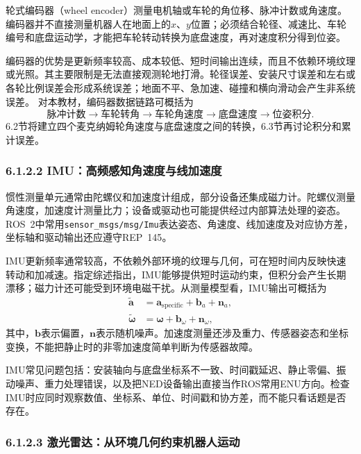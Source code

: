 \documentclass[UTF8,zihao=-4]{ctexart}
\newcommand{\vect}[1]{\bm{#1}}
\begin{document}
轮式编码器（wheel encoder）测量电机轴或车轮的角位移、脉冲计数或角速度。编码器并不直接测量机器人在地面上的$x$、$y$位置；必须结合轮径、减速比、车轮编号和底盘运动学，才能把车轮转动转换为底盘速度，再对速度积分得到位姿。

编码器的优势是更新频率较高、成本较低、短时间输出连续，而且不依赖环境纹理或光照。其主要限制是无法直接观测轮地打滑。轮径误差、安装尺寸误差和左右或各轮比例误差会形成系统误差；地面不平、急加速、碰撞和横向滑动会产生非系统误差。
对本教材，编码器数据链路可概括为
\begin{equation}
  \text{脉冲计数}
  \rightarrow \text{车轮转角}
  \rightarrow \text{车轮角速度}
  \rightarrow \text{底盘速度}
  \rightarrow \text{位姿积分}.
  \label{eq:encoder-chain}
\end{equation}
6.2节将建立四个麦克纳姆轮角速度与底盘速度之间的转换，6.3节再讨论积分和累计误差。

\subsubsection*{6.1.2.2 IMU：高频感知角速度与线加速度}

惯性测量单元通常由陀螺仪和加速度计组成，部分设备还集成磁力计。陀螺仪测量角速度，加速度计测量比力；设备或驱动也可能提供经过内部算法处理的姿态。ROS~2中常用\texttt{sensor\_msgs/msg/Imu}表达姿态、角速度、线加速度及对应协方差\cite{ros2imu}，坐标轴和驱动输出还应遵守REP~145\cite{rep145}。

IMU更新频率通常较高，不依赖外部环境的纹理与几何，可在短时间内反映快速转动和加减速。指定综述指出，IMU能够提供短时运动约束，但积分会产生长期漂移；磁力计还可能受到环境电磁干扰\cite{fan2025fusion}。从测量模型看，IMU输出可概括为
\begin{align}
  \widetilde{\vect{a}} &= \vect{a}_{\mathrm{specific}}+\vect{b}_a+\vect{n}_a,\\
  \widetilde{\vect{\omega}} &= \vect{\omega}+\vect{b}_{\omega}+\vect{n}_{\omega},
  \label{eq:imu-measurement}
\end{align}
其中，$\vect{b}$表示偏置，$\vect{n}$表示随机噪声。加速度测量还涉及重力、传感器姿态和坐标变换，不能把静止时的非零加速度简单判断为传感器故障。

IMU常见问题包括：安装轴向与底盘坐标系不一致、时间戳延迟、静止零偏、振动噪声、重力处理错误，以及把NED设备输出直接当作ROS常用ENU方向。检查IMU时应同时观察数值、坐标系、单位、时间戳和协方差，而不能只看话题是否存在。

\subsubsection*{6.1.2.3 激光雷达：从环境几何约束机器人运动}
\end{document}
